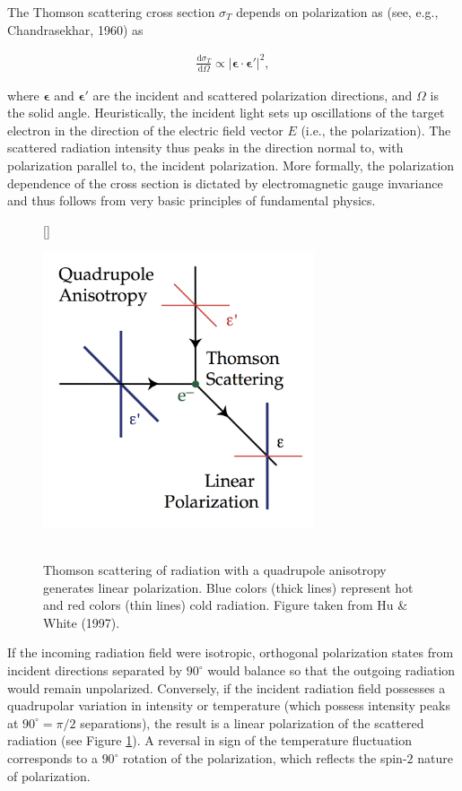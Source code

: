 \documentclass[a4paper,11pt]{article}
\begin{document}
{\noindent}The Thomson scattering cross section $\sigma_T$ depends on polarization as (see, e.g., Chandrasekhar, 1960) as 

\begin{align*}
    \frac{\mathrm{d}\sigma_T}{\mathrm{d}\Omega} \propto \lvert \bm{\epsilon}\cdot\bm{\epsilon}' \rvert^2,
\end{align*}

{\noindent}where $\bm{\epsilon}$ and $\bm{\epsilon}'$ are the incident and scattered polarization directions, and $\Omega$ is the solid angle. Heuristically, the incident light sets up oscillations of the target electron in the direction of the electric field vector $E$ (i.e., the polarization). The scattered radiation intensity thus peaks in the direction normal to, with polarization parallel to, the incident polarization. More formally, the polarization dependence of the cross section is dictated by electromagnetic gauge invariance and thus follows from very basic principles of fundamental physics.

\begin{figure}[h]
    [\FBwidth]
    {\caption{\footnotesize{\\Thomson scattering of radiation with a quadrupole anisotropy generates linear polarization. Blue colors (thick lines) represent hot and red colors (thin lines) cold radiation. Figure taken from Hu \& White (1997).}}
    \label{fig:Thomsonscattering}}
    {\includegraphics[width=8cm]{figures/ThomsonScattering.png}}
\end{figure}

{\noindent}If the incoming radiation field were isotropic, orthogonal polarization states from incident directions separated by $90^\circ$ would balance so that the outgoing radiation would remain unpolarized. Conversely, if the incident radiation field possesses a quadrupolar variation in intensity or temperature (which possess intensity peaks at $90^\circ=\pi/2$ separations), the result is a linear polarization of the scattered radiation (see Figure \ref{fig:Thomsonscattering}). A reversal in sign of the temperature fluctuation corresponds to a $90^\circ$ rotation of the polarization, which reflects the spin-$2$ nature of polarization.
\end{document}
